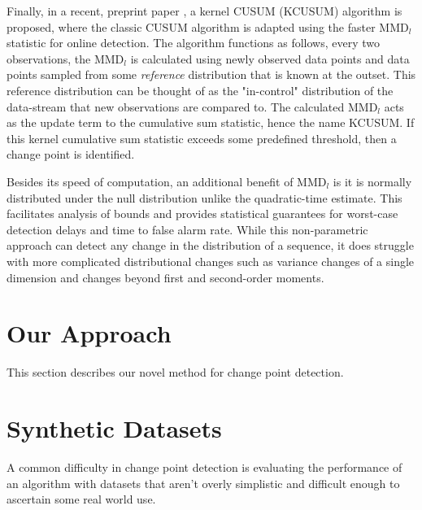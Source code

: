Finally, in a recent, preprint paper \cite{flynn2019change}, a kernel CUSUM (KCUSUM) algorithm is proposed, where the classic CUSUM algorithm is adapted using the faster MMD$_l$ statistic for online detection. The algorithm functions as follows, every two observations, the MMD$_l$ is calculated using newly observed data points and data points sampled from some \textit{reference} distribution that is known at the outset. This reference distribution can be thought of as the "in-control" distribution of the data-stream that new observations are compared to. The calculated MMD$_l$ acts as the update term to the cumulative sum statistic, hence the name KCUSUM. If this kernel cumulative sum statistic exceeds some predefined threshold, then a change point is identified. 

Besides its speed of computation, an additional benefit of MMD$_l$ is it is normally distributed under the null distribution unlike the quadratic-time estimate. This facilitates analysis of bounds and provides statistical guarantees for worst-case detection delays and time to false alarm rate. While this non-parametric approach can detect any change in the distribution of a sequence, it does struggle with more complicated distributional changes such as variance changes of a single dimension and changes beyond first and second-order moments.


\section{Our Approach}

This section describes our novel method for change point detection.


\section{Synthetic Datasets}
A common difficulty in change point detection is evaluating the performance of an algorithm with datasets that aren't overly simplistic and difficult enough to ascertain some real world use.

